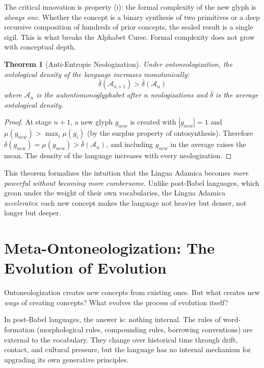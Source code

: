 \documentclass[12pt, letterpaper]{book}
\def\equiv{=}%
\def\mathfrak#1{#1}%
\newtheorem{theorem}{Theorem}[chapter]
\begin{document}
The critical innovation is property (i): the formal complexity of the new glyph is \textit{always one}. Whether the concept is a binary synthesis of two primitives or a deep recursive composition of hundreds of prior concepts, the sealed result is a single sigil. This is what breaks the Alphabet Curse. Formal complexity does not grow with conceptual depth.

\begin{theorem}[Anti-Entropic Neologization]\label{thm:anti-entropic}
Under ontoneologization, the ontological density of the language increases monotonically:
\[
\bar{\delta}(\mathcal{A}_{n+1}) > \bar{\delta}(\mathcal{A}_n)
\]
where $\mathcal{A}_n$ is the autontomonoglyphabet after $n$ neologizations and $\bar{\delta}$ is the average ontological density.
\end{theorem}

\begin{proof}
At stage $n+1$, a new glyph $\mathfrak{g}_{new}$ is created with $|\mathfrak{g}_{new}| \equiv 1$ and $\mu(\mathfrak{g}_{new}) > \max_i \mu(\mathfrak{g}_i)$ (by the surplus property of ontosynthesis). Therefore $\delta(\mathfrak{g}_{new}) \equiv \mu(\mathfrak{g}_{new}) > \bar{\delta}(\mathcal{A}_n)$, and including $\mathfrak{g}_{new}$ in the average raises the mean. The density of the language increases with every neologization.
\end{proof}

This theorem formalizes the intuition that the Lingua Adamica becomes \textit{more powerful without becoming more cumbersome}. Unlike post-Babel languages, which groan under the weight of their own vocabularies, the Lingua Adamica \textit{accelerates}: each new concept makes the language not heavier but denser, not longer but deeper.


\section{Meta-Ontoneologization: The Evolution of Evolution}

Ontoneologization creates new concepts from existing ones. But what creates new \textit{ways} of creating concepts? What evolves the process of evolution itself?

In post-Babel languages, the answer is: nothing internal. The rules of word-formation (morphological rules, compounding rules, borrowing conventions) are external to the vocabulary. They change over historical time through drift, contact, and cultural pressure, but the language has no internal mechanism for upgrading its own generative principles.
\end{document}

